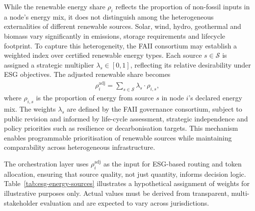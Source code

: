 \documentclass[oneside,10pt]{swissi}
\begin{document}
While the renewable energy share \( \rho_i \) reflects the proportion of non-fossil inputs in a node’s energy mix, it does not distinguish among the heterogeneous externalities of different renewable sources. Solar, wind, hydro, geothermal and biomass vary significantly in emissions, storage requirements and lifecycle footprint. To capture this heterogeneity, the FAII consortium may establish a weighted index over certified renewable energy types. Each source \( s \in \mathcal{S} \) is assigned a strategic multiplier \( \lambda_s \in [0,1] \), reflecting its relative desirability under ESG objectives. The adjusted renewable share becomes
\begin{align}
\rho_i^{\text{adj}} = \sum_{s \in \mathcal{S}} \lambda_s \cdot \rho_{i,s},
\end{align}
where \( \rho_{i,s} \) is the proportion of energy from source \( s \) in node \( i \)’s declared energy mix. The weights \( \lambda_s \) are defined by the FAII governance consortium, subject to public revision and informed by life-cycle assessment, strategic independence and policy priorities such as resilience or decarbonisation targets. This mechanism enables programmable prioritisation of renewable sources while maintaining comparability across heterogeneous infrastructure.

The orchestration layer uses \( \rho_i^{\text{adj}} \) as the input for ESG-based routing and token allocation, ensuring that source quality, not just quantity, informs decision logic. Table~\ref{tab:esg-energy-sources} illustrates a hypothetical assignment of weights for illustrative purposes only. Actual values must be derived from transparent, multi-stakeholder evaluation and are expected to vary across jurisdictions.
\end{document}
